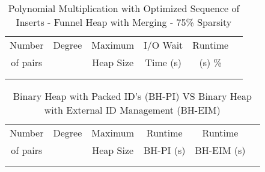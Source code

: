 \documentclass[11pt, one-sided]{amsart}
\begin{document}
\begin{table}[htbp]
   \centering
      \caption{Polynomial Multiplication with Optimized Sequence of Inserts - Funnel Heap with Merging - 75\% Sparsity}
   \begin{tabular}{|c|c|c|c|c|c|}
   	\hline
		 Number   & 	Degree	& Maximum & I/O Wait		& Runtime 	 \\ 
		 of pairs 	&			& Heap Size	& Time (s)		&	(s)		 		\%				\\ \hline
		 		&			&			&			&						\\
		 		&			&			&			&						\\
   \end{tabular}
   \label{tab:booktabs}
\end{table}



\newpage
{}

\begin{table}[htbp]
   \centering
      \caption{Binary Heap with Packed ID's (BH-PI) VS Binary Heap with External ID Management (BH-EIM)}
   \begin{tabular}{|c|c|c|c|c|c|}
   	\hline
		 Number   & 	Degree	& Maximum 	& Runtime	& Runtime 		 \\ 
		 of pairs 	&			& Heap Size	& BH-PI (s)	& BH-EIM (s)		\\ \hline
		 		&			&			&			&				\\
		 		&			&			&			&				\\
   \end{tabular}
   \label{tab:booktabs}
\end{table}


\newpage
{}
\end{document}
